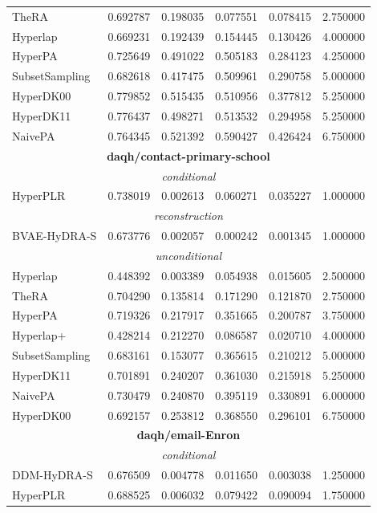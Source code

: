 \begin{tabular}{lrrrrr}
TheRA & 0.692787 & 0.198035 & 0.077551 & 0.078415 & 2.750000 \\
Hyperlap & 0.669231 & 0.192439 & 0.154445 & 0.130426 & 4.000000 \\
HyperPA & 0.725649 & 0.491022 & 0.505183 & 0.284123 & 4.250000 \\
SubsetSampling & 0.682618 & 0.417475 & 0.509961 & 0.290758 & 5.000000 \\
HyperDK00 & 0.779852 & 0.515435 & 0.510956 & 0.377812 & 5.250000 \\
HyperDK11 & 0.776437 & 0.498271 & 0.513532 & 0.294958 & 5.250000 \\
NaivePA & 0.764345 & 0.521392 & 0.590427 & 0.426424 & 6.750000 \\
\midrule
\midrule
\multicolumn{6}{c}{\textbf{daqh/contact-primary-school}} \\
\midrule
\midrule
\multicolumn{6}{c}{\emph{conditional}} \\
\midrule
HyperPLR & 0.738019 & 0.002613 & 0.060271 & 0.035227 & 1.000000 \\
\midrule
\multicolumn{6}{c}{\emph{reconstruction}} \\
\midrule
BVAE-HyDRA-S & 0.673776 & 0.002057 & 0.000242 & 0.001345 & 1.000000 \\
\midrule
\multicolumn{6}{c}{\emph{unconditional}} \\
\midrule
Hyperlap & 0.448392 & 0.003389 & 0.054938 & 0.015605 & 2.500000 \\
TheRA & 0.704290 & 0.135814 & 0.171290 & 0.121870 & 2.750000 \\
HyperPA & 0.719326 & 0.217917 & 0.351665 & 0.200787 & 3.750000 \\
Hyperlap+ & 0.428214 & 0.212270 & 0.086587 & 0.020710 & 4.000000 \\
SubsetSampling & 0.683161 & 0.153077 & 0.365615 & 0.210212 & 5.000000 \\
HyperDK11 & 0.701891 & 0.240207 & 0.361030 & 0.215918 & 5.250000 \\
NaivePA & 0.730479 & 0.240870 & 0.395119 & 0.330891 & 6.000000 \\
HyperDK00 & 0.692157 & 0.253812 & 0.368550 & 0.296101 & 6.750000 \\
\midrule
\midrule
\multicolumn{6}{c}{\textbf{daqh/email-Enron}} \\
\midrule
\midrule
\multicolumn{6}{c}{\emph{conditional}} \\
\midrule
DDM-HyDRA-S & 0.676509 & 0.004778 & 0.011650 & 0.003038 & 1.250000 \\
HyperPLR & 0.688525 & 0.006032 & 0.079422 & 0.090094 & 1.750000 \\

\end{tabular}
